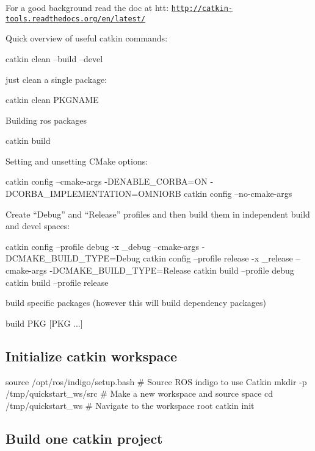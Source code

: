 For a good background read the doc at htt\-: {\ttfamily \href{http://catkin-tools.readthedocs.org/en/latest/}{\tt http\-://catkin-\/tools.\-readthedocs.\-org/en/latest/}}

Quick overview of useful catkin commands\-: \begin{DoxyVerb}catkin clean --build --devel
\end{DoxyVerb}


just clean a single package\-: \begin{DoxyVerb}    catkin clean PKGNAME
\end{DoxyVerb}


Building ros packages \begin{DoxyVerb}catkin build   
\end{DoxyVerb}


Setting and unsetting C\-Make options\-: \begin{DoxyVerb}    catkin config --cmake-args -DENABLE_CORBA=ON -DCORBA_IMPLEMENTATION=OMNIORB
    catkin config --no-cmake-args
\end{DoxyVerb}


Create “\-Debug” and “\-Release” profiles and then build them in independent build and devel spaces\-: \begin{DoxyVerb}catkin config --profile debug -x _debug --cmake-args -DCMAKE_BUILD_TYPE=Debug
catkin config --profile release -x _release --cmake-args -DCMAKE_BUILD_TYPE=Release
catkin build --profile debug
catkin build --profile release
\end{DoxyVerb}


build specific packages (however this will build dependency packages) \begin{DoxyVerb}build PKG [PKG ...]
\end{DoxyVerb}


\subsection*{Initialize catkin workspace }

\begin{DoxyVerb}source /opt/ros/indigo/setup.bash          # Source ROS indigo to use Catkin
mkdir -p /tmp/quickstart_ws/src            # Make a new workspace and source space
cd /tmp/quickstart_ws                      # Navigate to the workspace root
catkin init     
\end{DoxyVerb}


\subsection*{Build one catkin project }

